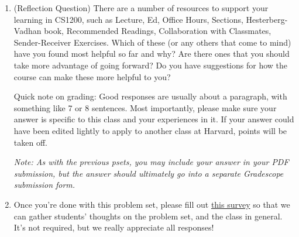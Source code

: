 \documentclass[11pt]{article}
\begin{document}
\begin{enumerate}
\begin{enumerate}
            Line 10 has $k$ additions and $O(k)$ multiplications, assuming that we've either pre-calculated the $b$ exponents or that exponentiation takes constant time. This makes for a line 10 runtime of $O(k)+O(k)=O(k)$.
            
            So lines 9-10 have a total runtime of $n\cdot O(k)=O(n\cdot k)$.
            
            Line 11 is a return that copies $2n$ elements.
            
            So the total algorithm has a runtime of $O(1)+O(n\cdot k)+O((n+b)\cdot k)+O(n\cdot k)+2n=O((3n+b)\cdot k=O((n+b)\cdot k)$. Since $k=\lceil log_bU\rceil$, then the runtime is $O((n+b)\cdot\lceil log_bU\rceil)$. If $b=min\{n, U\}$, then the runtime is the maximum of $O((n+n)\cdot\lceil log_bU\rceil)=O(n\cdot\lceil log_bU\rceil)$ and $O((n+U)\cdot\lceil log_bU\rceil)$, which is the larger $O((n+U)\cdot\lceil log_bU\rceil)$.

        \end{enumerate}

\item (Reflection Question)  There are a number of resources to support your learning in CS1200, such as Lecture, Ed, Office Hours, Sections, Hesterberg-Vadhan book, Recommended Readings, Collaboration with Classmates, Sender-Receiver Exercises.  Which of these (or any others that come to mind) have you found most helpful so far and why?  Are there ones that you should take more advantage of going forward?  Do you have suggestions for how the course can make these more helpful to you?

Quick note on grading: Good responses are usually about a paragraph, with something like 7 or 8 sentences. Most importantly, please make sure your answer is specific to this class and your experiences in it. If your answer could have been edited lightly to apply to another class at Harvard, points will be taken off.

\textit{Note: As with the previous psets, you may include your answer in your PDF submission, but the answer should ultimately go into a separate Gradescope submission form.}

\item Once you're done with this problem set, please fill out \href{https://forms.gle/D1v2oEsnV9TPNoVt8}{this survey} so that we can gather students' thoughts on the problem set, and the class in general. It's not required, but we really appreciate all responses!
\end{enumerate}
\end{document}
